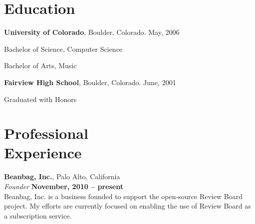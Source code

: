 \documentclass[margin,line]{resume}
\begin{document}
\begin{resume}
    \section{\mysidestyle Education}

    {\bf University of Colorado}, Boulder, Colorado.  May, 2006 \vspace{2mm}%
    \begin{list1}
    \item[] Bachelor of Science, Computer Science
    \item[] Bachelor of Arts, Music
    \end{list1}
    \ifcv
        {\bf Fairview High School}, Boulder, Colorado.  June, 2001 \vspace{2mm}%
        \begin{list1}
        \item[] Graduated with Honors
        \end{list1}
    \fi


    \section{\mysidestyle Professional\\Experience}

    {\bf Beanbag, Inc.}, Palo Alto, California \vspace{2mm}\\\vspace{1mm}%
    {\sl Founder} \hfill {\bf November, 2010 -- present }\\
    Beanbag, Inc. is a business founded to support the open-source Review Board
    project. My efforts are currently focused on enabling the use of Review
    Board as a subscription service.


\end{resume}
\end{document}
